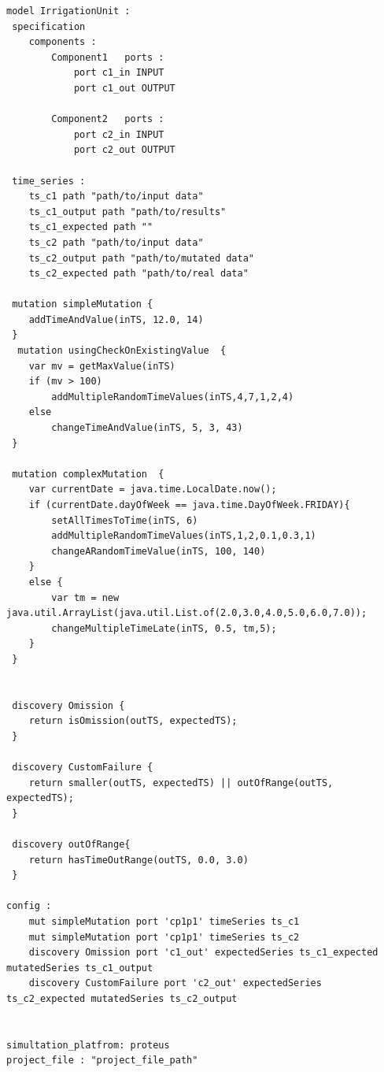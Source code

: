 \begin{lstlisting}[style=JavaStyle,caption=Specification of the irrigation plant in \tool,label=lst:dslSpec]   
model IrrigationUnit :
 specification
 	components : 
	 	Component1	 ports : 	
	 		port c1_in INPUT 
	 		port c1_out OUTPUT  
	 		
	 	Component2	 ports : 	
	 		port c2_in INPUT 
	 		port c2_out OUTPUT
 
 time_series :
 	ts_c1 path "path/to/input data"
	ts_c1_output path "path/to/results"
	ts_c1_expected path ""
	ts_c2 path "path/to/input data"
	ts_c2_output path "path/to/mutated data"
	ts_c2_expected path "path/to/real data"
 	 
 mutation simpleMutation {
 	addTimeAndValue(inTS, 12.0, 14)
 } 	
  mutation usingCheckOnExistingValue  {   
 	var mv = getMaxValue(inTS)
 	if (mv > 100)
 		addMultipleRandomTimeValues(inTS,4,7,1,2,4)
 	else
 		changeTimeAndValue(inTS, 5, 3, 43)
 } 
 
 mutation complexMutation  {   
 	var currentDate = java.time.LocalDate.now();
 	if (currentDate.dayOfWeek == java.time.DayOfWeek.FRIDAY){
		setAllTimesToTime(inTS, 6)
		addMultipleRandomTimeValues(inTS,1,2,0.1,0.3,1) 
 		changeARandomTimeValue(inTS, 100, 140) 	
 	}
 	else {
 		var tm = new java.util.ArrayList(java.util.List.of(2.0,3.0,4.0,5.0,6.0,7.0));
 		changeMultipleTimeLate(inTS, 0.5, tm,5);
 	}
 }
 
 
 discovery Omission {
 	return isOmission(outTS, expectedTS); 
 }
 
 discovery CustomFailure {
 	return smaller(outTS, expectedTS) || outOfRange(outTS, expectedTS);
 }
 
 discovery outOfRange{
 	return hasTimeOutRange(outTS, 0.0, 3.0)
 }
 
config :
	mut simpleMutation port 'cp1p1' timeSeries ts_c1
	mut simpleMutation port 'cp1p1' timeSeries ts_c2
	discovery Omission port 'c1_out' expectedSeries ts_c1_expected mutatedSeries ts_c1_output
	discovery CustomFailure port 'c2_out' expectedSeries ts_c2_expected mutatedSeries ts_c2_output  
	 
		 
simultation_platfrom: proteus
project_file : "project_file_path"
\end{lstlisting}





